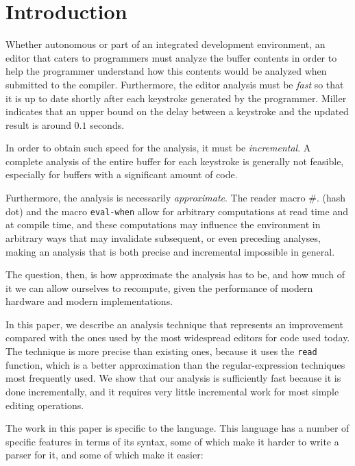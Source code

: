 \section{Introduction}

Whether autonomous or part of an integrated development environment,
an editor that caters to \commonlisp{} programmers must analyze the
buffer contents in order to help the programmer understand how this
contents would be analyzed when submitted to the \commonlisp{}
compiler.  Furthermore, the editor analysis must be \emph{fast} so
that it is up to date shortly after each keystroke generated by the
programmer.  Miller \cite{Miller:1968:RTM:1476589.1476628} indicates
that an upper bound on the delay between a keystroke and the updated
result is around $0.1$ seconds.

In order to obtain such speed for the analysis, it must be
\emph{incremental}.  A complete analysis of the entire buffer for each
keystroke is generally not feasible, especially for buffers with a
significant amount of code.

Furthermore, the analysis is necessarily \emph{approximate}.  The
reader macro \#. (hash dot) and the macro \texttt{eval-when} allow for
arbitrary computations at read time and at compile time, and these
computations may influence the environment in arbitrary ways that may
invalidate subsequent, or even preceding analyses, making an analysis
that is both precise and incremental impossible in general.

The question, then, is how approximate the analysis has to be, and how
much of it we can allow ourselves to recompute, given the performance
of modern hardware and modern \commonlisp{} implementations.

In this paper, we describe an analysis technique that represents an
improvement compared with the ones used by the most widespread editors
for \commonlisp{} code used today.  The technique is more precise than
existing ones, because it uses the \commonlisp{} \texttt{read}
function, which is a better approximation than the regular-expression
techniques most frequently used.  We show that our analysis is
sufficiently fast because it is done incrementally, and it requires
very little incremental work for most simple editing operations.

The work in this paper is specific to the \commonlisp{} language.
This language has a number of specific features in terms of its
syntax, some of which make it harder to write a parser for it, and
some of which make it easier:

